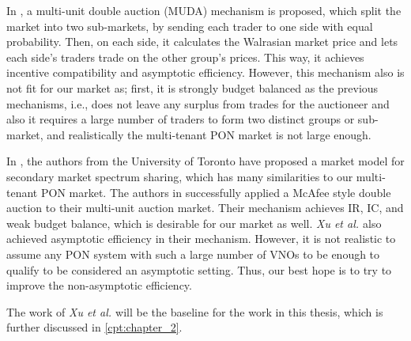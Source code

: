 In \cite{muda}, a multi-unit double auction (MUDA) mechanism is proposed, which split the market into two sub-markets, by sending each trader to one side with equal probability. Then, on each side, it calculates the Walrasian market price and lets each side's traders trade on the other group's prices. This way, it achieves incentive compatibility and asymptotic efficiency. However, this mechanism also is not fit for our market as; first, it is strongly budget balanced as the previous mechanisms, i.e., does not leave any surplus from trades for the auctioneer and also it requires a large number of traders to form two distinct groups or sub-market, and realistically the multi-tenant \ac{PON} market is not large enough.

In \cite{5462277}, the authors from the University of Toronto have proposed a market model for secondary market spectrum sharing, which has many similarities to our multi-tenant \ac{PON} market. The authors in \cite{5462277} successfully applied a McAfee \cite{MCAFEE1992434} style double auction to their multi-unit auction market. Their mechanism achieves \ac{IR}, \ac{IC}, and weak budget balance, which is desirable for our market as well. \textit{Xu et al. \cite{5462277}} also achieved asymptotic efficiency in their mechanism. However, it is not realistic to assume any \ac{PON} system with such a large number of \acp{VNO} to be enough to qualify to be considered an asymptotic setting. Thus, our best hope is to try to improve the non-asymptotic efficiency.

The work of \textit{Xu et al. \cite{5462277}} will be the baseline for the work in this thesis, which is further discussed in \ref{cpt:chapter_2}.

